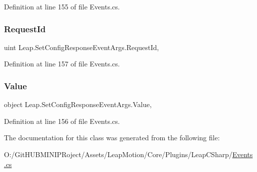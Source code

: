 Definition at line 155 of file Events.\+cs.

\mbox{\label{class_leap_1_1_set_config_response_event_args_a12762ce21e86f99bd99f45342a98d80c}} 
\subsubsection{\texorpdfstring{RequestId}{RequestId}}
{\footnotesize\ttfamily uint Leap.\+Set\+Config\+Response\+Event\+Args.\+Request\+Id\hspace{0.3cm}{\ttfamily [get]}, {\ttfamily [set]}}



Definition at line 157 of file Events.\+cs.

\mbox{\label{class_leap_1_1_set_config_response_event_args_af0e62482b156c77d3c3796bb9e8a1661}} 
\subsubsection{\texorpdfstring{Value}{Value}}
{\footnotesize\ttfamily object Leap.\+Set\+Config\+Response\+Event\+Args.\+Value\hspace{0.3cm}{\ttfamily [get]}, {\ttfamily [set]}}



Definition at line 156 of file Events.\+cs.



The documentation for this class was generated from the following file\+:\begin{DoxyCompactItemize}
\item 
O\+:/\+Git\+H\+U\+B\+M\+I\+N\+I\+P\+Roject/\+Assets/\+Leap\+Motion/\+Core/\+Plugins/\+Leap\+C\+Sharp/\mbox{\hyperlink{_events_8cs}{Events.\+cs}}\end{DoxyCompactItemize}
